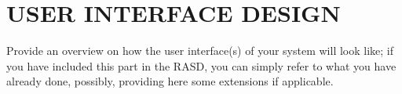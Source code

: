 \section{USER  INTERFACE  DESIGN}  
Provide  an  overview  on  how  the  user  interface(s)  of  your  system  will look like; if you have included this part in the RASD, you can simply refer to what you have 
already done, possibly, providing here some extensions if applicable. 